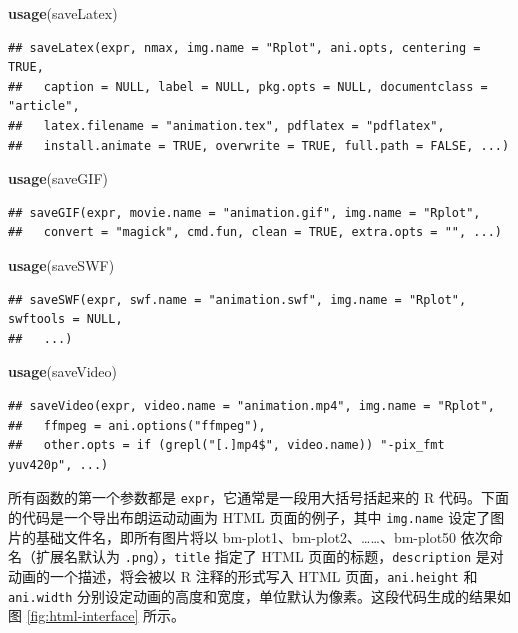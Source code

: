 \documentclass[
  b5paper,
  UTF8,twoside]{book}
\newenvironment{Shaded}{\begin{snugshade}}{\end{snugshade}}
\newcommand{\FunctionTok}[1]{\textcolor[rgb]{0.13,0.29,0.53}{\textbf{#1}}}
\newcommand{\NormalTok}[1]{#1}
\begin{document}
\begin{Shaded}
\begin{Highlighting}[]
\FunctionTok{usage}\NormalTok{(saveLatex)}
\end{Highlighting}
\end{Shaded}

\begin{verbatim}
## saveLatex(expr, nmax, img.name = "Rplot", ani.opts, centering = TRUE,
##   caption = NULL, label = NULL, pkg.opts = NULL, documentclass = "article",
##   latex.filename = "animation.tex", pdflatex = "pdflatex",
##   install.animate = TRUE, overwrite = TRUE, full.path = FALSE, ...)
\end{verbatim}

\begin{Shaded}
\begin{Highlighting}[]
\FunctionTok{usage}\NormalTok{(saveGIF)}
\end{Highlighting}
\end{Shaded}

\begin{verbatim}
## saveGIF(expr, movie.name = "animation.gif", img.name = "Rplot",
##   convert = "magick", cmd.fun, clean = TRUE, extra.opts = "", ...)
\end{verbatim}

\begin{Shaded}
\begin{Highlighting}[]
\FunctionTok{usage}\NormalTok{(saveSWF)}
\end{Highlighting}
\end{Shaded}

\begin{verbatim}
## saveSWF(expr, swf.name = "animation.swf", img.name = "Rplot", swftools = NULL,
##   ...)
\end{verbatim}

\begin{Shaded}
\begin{Highlighting}[]
\FunctionTok{usage}\NormalTok{(saveVideo)}
\end{Highlighting}
\end{Shaded}

\begin{verbatim}
## saveVideo(expr, video.name = "animation.mp4", img.name = "Rplot",
##   ffmpeg = ani.options("ffmpeg"),
##   other.opts = if (grepl("[.]mp4$", video.name)) "-pix_fmt yuv420p", ...)
\end{verbatim}

所有函数的第一个参数都是 \texttt{expr}，它通常是一段用大括号括起来的 R 代码。下面的代码是一个导出布朗运动动画为 HTML 页面的例子，其中 \texttt{img.name} 设定了图片的基础文件名，即所有图片将以 bm-plot1、bm-plot2、\ldots\ldots、bm-plot50 依次命名（扩展名默认为 \texttt{.png}），\texttt{title} 指定了 HTML 页面的标题，\texttt{description} 是对动画的一个描述，将会被以 R 注释的形式写入 HTML 页面，\texttt{ani.height} 和 \texttt{ani.width} 分别设定动画的高度和宽度，单位默认为像素。这段代码生成的结果如图 \ref{fig:html-interface} 所示。
\end{document}
